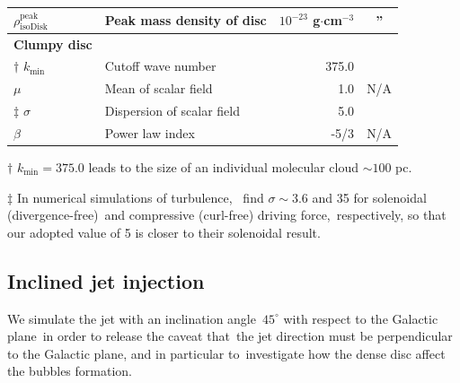 \documentclass[twocolumn]{aastex631}
\begin{document}
\begin{table}[t]
\begin{tabular}{@{}llrc@{}}
$\rho_{\text{isoDisk}}^{\text{peak}}$ & Peak mass density of disc                 & $10^{-23}$ g$\cdot$cm$^{-3}$         & \multicolumn{1}{c}{''}         \\ \hline
{\bf Clumpy disc }                    &                                           &                                      &                                \\
$\dagger$  $k_{\text{min}}$           & Cutoff wave number                        & 375.0                                & \citep{peak-ism-density}       \\
$\mu$                                 & Mean of scalar field                      & 1.0                                  &   N/A                          \\
$\ddag$  $\sigma$                     & Dispersion of scalar field                & 5.0                                  & \citep{Federrath2010}          \\
$\beta$                               & Power law index                           & -5/3                                 &   N/A                          \\ \midrule
\end{tabular}
\begin{tablenotes}
      \raggedright
      \item  $\dagger$  $k_{\text{min}}=375.0$ leads to the size of an individual molecular cloud $\sim 100$ pc.
      \item  $\ddag$ In numerical simulations of turbulence,\
             \citet{Federrath2010} find $\sigma\sim 3.6$ and 35 for solenoidal (divergence-free)\
             and compressive (curl-free) driving force,\
             respectively, so that our adopted value of 5 is closer to their solenoidal result.
    \end{tablenotes}
\end{table}


%

\subsection{Inclined jet injection}

  We simulate the jet with an inclination angle\
  $45^{\circ}$ with respect to the Galactic plane\
  in order to release the caveat that\
  the jet direction must be perpendicular to the Galactic plane, and in particular to\
  investigate how the dense disc affect the bubbles formation.
\end{document}
